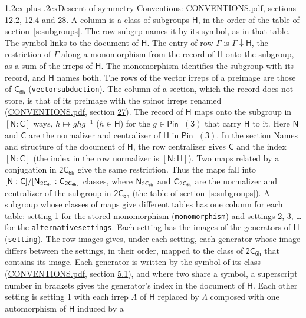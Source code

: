 \documentclass[10pt,a4paper]{article}
\makeatletter
\renewcommand\section{\@startsection{section}{1}{\z@}{-3ex plus -1ex minus -.2ex}%
  {1.2ex plus .2ex}{\normalfont\large\sffamily\bfseries\color{parttitle}}}
\numberwithin{equation}{section}
\newcommand{\grp}[1]{\mathsf{#1}}
\newcommand{\grpindex}[2]{[#1 : #2]}
\newcommand{\restr}[2]{#1\!\downarrow#2}
\newcommand{\hairsp}{\mkern1mu}
\makeatother
\begin{document}
\section{Descent of symmetry}\label{s:subduction}
Conventions: \href{../../CONVENTIONS.pdf}{CONVENTIONS.pdf}, sections \href{../../../rotation/CONVENTIONS.pdf\#conv.12.2}{12.2}, \href{../../../rotation/CONVENTIONS.pdf\#conv.12.4}{12.4} and \href{../../CONVENTIONS.pdf\#conv.28}{28}.
A column is a class of subgroups $\grp{H}$, in the order of the table of section~\ref{s:subgroups}. The row subgrp names it by its symbol, as in that table. The symbol links to the document of $\grp{H}$. The entry of row $\Gamma$ is $\restr{\Gamma}{\grp{H}}$, the restriction of $\Gamma$ along a monomorphism from the record of $\grp{H}$ onto the subgroup, as a sum of the irreps of $\grp{H}$. The monomorphism identifies the subgroup with its record, and $\grp{H}$ names both. The rows of the vector irreps of a preimage are those of \href{../../../rotation/data/pdf/C6h.pdf}{$\grp{C_{6h}}$} (\texttt{vectorsubduction}). The column of a section, which the record does not store, is that of its preimage with the spinor irreps renamed (\href{../../CONVENTIONS.pdf}{CONVENTIONS.pdf}, section \href{../../CONVENTIONS.pdf\#conv.27}{27}). \label{n:group.normalizer.o3}\label{n:group.centralizer.o3}\label{n:element.h}The record of $\grp{H}$ maps onto the subgroup in $\grpindex{\grp{N}}{\grp{C}}$ ways, $h \mapsto g h g^{-1}$ ($h \in \grp{H}$) for the $g \in \grp{Pin^{-}(3)}$ that carry $\grp{H}$ to it. Here $\grp{N}$ and $\grp{C}$ are the normalizer and centralizer of $\grp{H}$ in \href{Pinminus3.pdf}{$\grp{Pin^{-}(3)}$}. In the section Names and structure of the document of $\grp{H}$, the row centralizer gives $\grp{C}$ and the index $\grpindex{\grp{N}}{\grp{C}}$ (the index in the row normalizer is $\grpindex{\grp{N}}{\grp{H}}$). Two maps related by a conjugation in $\grp{2C_{6h}}$ give the same restriction. Thus the maps fall into $\grpindex{\grp{N}}{\grp{C}}/\grpindex{\grp{N}_{\hairsp \grp{2C_{6h}}}}{\grp{C}_{\hairsp \grp{2C_{6h}}}}$ classes, where $\grp{N}_{\hairsp \grp{2C_{6h}}}$ and $\grp{C}_{\hairsp \grp{2C_{6h}}}$ are the normalizer and centralizer of the subgroup in $\grp{2C_{6h}}$ (the table of section~\ref{s:subgroups}). \label{n:head.setting}A subgroup whose classes of maps give different tables has one column for each table: setting 1 for the stored monomorphism (\texttt{monomorphism}) and settings 2, 3, \dots{} for the \texttt{alternativesettings}. Each setting has the images of the generators of $\grp{H}$ (\texttt{setting}). \label{n:head.images}The row images gives, under each setting, each generator whose image differs between the settings, in their order, mapped to the class of $\grp{2C_{6h}}$ that contains its image. Each generator is written by the symbol of its class (\href{../../CONVENTIONS.pdf}{CONVENTIONS.pdf}, section \href{../../../rotation/CONVENTIONS.pdf\#conv.5.1}{5.1}), and where two share a symbol, a superscript number in brackets gives the generator's index in the document of $\grp{H}$. \label{n:irrep.Delta}Each other setting is setting 1 with each irrep $\Lambda$ of $\grp{H}$ replaced by $\Lambda$ composed with one automorphism of $\grp{H}$ induced by a 
\end{document}
